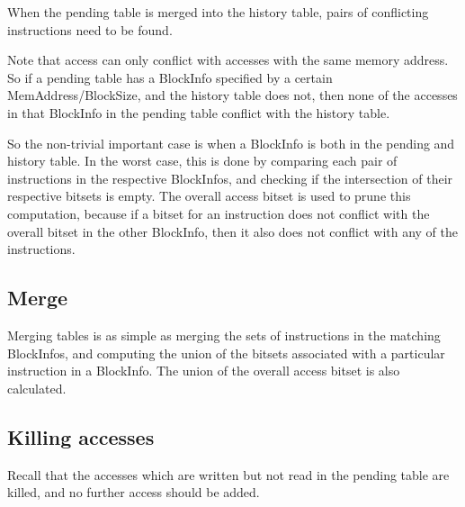 \documentclass[12pt,twoside]{reedthesis}
\begin{document}
			When the pending table is merged into the history table, pairs of conflicting instructions need to be found. 
			
			Note that access can only conflict with accesses with the same memory address. So if a pending table has a BlockInfo specified by a certain MemAddress/BlockSize, and the history table does not, then none of the accesses in that BlockInfo in the pending table conflict with the history table. 
			
			So the non-trivial important case is when a BlockInfo is both in the pending and history table. 
			In the worst case, this is done by comparing each pair of instructions in the respective BlockInfos, and checking if the intersection of their respective bitsets is empty. The overall access bitset is used to prune this computation, because if a bitset for an instruction does not conflict with the overall bitset in the other BlockInfo, then it also does not conflict with any of the instructions. %
			
			
			\subsection{Merge}
			
			Merging tables is as simple as merging the sets of instructions in the matching BlockInfos, and computing the union of the bitsets associated with a particular instruction in a BlockInfo. The union of the overall access bitset is also calculated. 
			
			\subsection{Killing accesses}
			
			Recall that the accesses which are written but not read in the pending table are killed, and no further access should be added.
			
\end{document}
